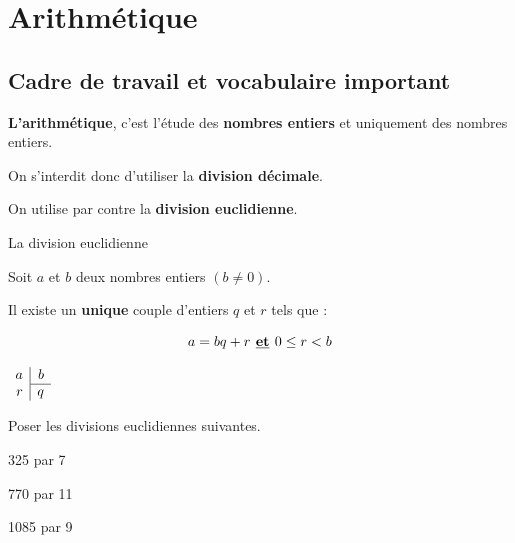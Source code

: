 \documentclass[a4paper]{book}
\begin{document}
\setcounter{chapter}{5}
\newcommand{\monTitre}{Arithmétique}
\chapter{\monTitre}
\thispagestyle{fancy} 


\section{Cadre de travail et vocabulaire important}
    \textbf{L'arithmétique}, c'est l'étude des \textbf{nombres entiers} et uniquement des nombres entiers.

    \medskip

    On s'interdit donc d'utiliser la \textbf{division décimale}.

    On utilise par contre la \textbf{division euclidienne}.

    \begin{proprieteTitre}{La division euclidienne}
        \begin{minipage}{0.6\linewidth}
            Soit $a$ et $b$ deux nombres entiers $(b\neq 0)$.
    
            Il existe un \textbf{unique} couple d'entiers $q$ et $r$ tels que :
    
            \[a=bq+r \textbf{ \underline{et} } 0\leq r < b\]
    
        \end{minipage}
        \hfill
        \begin{minipage}{0.35\linewidth}
            $\begin{array}{r|r}
            a & b \\ \cline{2-2}
            r & q 
            \end{array}$
        \end{minipage} 
    \end{proprieteTitre}


    \begin{exemple}
        Poser les divisions euclidiennes suivantes.

        \smallskip

        \begin{minipage}{0.30\linewidth}
            325 par 7
            
            \vspace{3cm}
        \end{minipage}
        \hfill
        \vline
        \hfill
        \begin{minipage}{0.30\linewidth}
            770 par 11 
             
            \vspace{3cm}
        \end{minipage}
        \hfill
        \vline
        \hfill
        \begin{minipage}{0.30\linewidth}
            1085 par 9
            
            \vspace{3cm}
        \end{minipage}
    \end{exemple}
\end{document}

